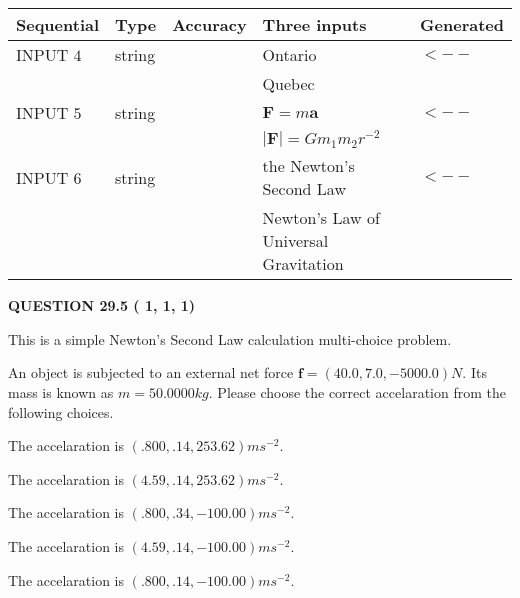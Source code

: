 \documentclass[12pt]{article}
\begin{document}
   
  
  
\noindent\begin{tabular}{|l|l|l|l|l|}
\hline
 Sequential & Type & Accuracy & Three inputs & Generated \\ 
\hline
 
 
  INPUT $           4$ & string & & 
 Ontario & 
  $ <-- $ 
  \\
  & & & 
 Quebec & 
 \\  \hline  
 
 
  INPUT $           5$ & string & & 
 $\mathbf{F}=m\mathbf{a}$ & 
  $ <-- $ 
  \\
  & & & 
 $\left| \mathbf{F}\right| =Gm_1m_2r^{-2}$ & 
 \\  \hline  
 
 
  INPUT $           6$ & string & & 
 the Newton's Second Law & 
  $ <-- $ 
  \\
  & & & 
 Newton's Law of Universal Gravitation & 
 \\  \hline  
 \end{tabular}
   
   
  
\vspace{0.2in}
  
{\textbf{\Large{QUESTION
29.5 
 (          1,          1,          1)
}}}
  
  


\noindent{}
This is a simple Newton's Second Law calculation multi-choice problem.  
\noindent{}


 
 
An object is subjected to an external net force $\mathbf{f}=
(40.0 , 7.0 , -5000.0) N$.
Its mass is known as $m= %
50.0000 kg$. Please choose the
correct accelaration from the following choices.
 
 
 
The accelaration is $  %
(
.800,
.14,
253.62)
ms^{-2} $.
 
 
The accelaration is $  %
(
4.59,
.14,
253.62)
ms^{-2} $.
 
 
The accelaration is $  %
(
.800,
.34,
-100.00)
ms^{-2} $.
 
 
The accelaration is $  %
(
4.59,
.14,
-100.00)
ms^{-2} $.
 
 
The accelaration is $  %
(
.800,
.14,
-100.00)
ms^{-2} $.
 
\end{document}
